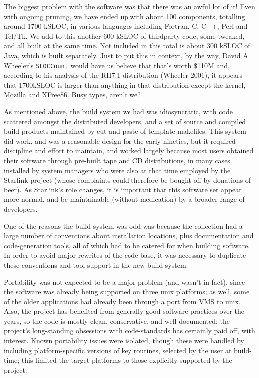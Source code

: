 \documentclass[11pt,twoside]{article}
\begin{document}
The biggest problem with the software was that there was an awful lot
of it!  Even with ongoing pruning, we have ended up with about 100
components, totalling around 1700 kSLOC, in various languages
including Fortran, C, C++, Perl and Tcl/Tk.  We add to this another
600 kSLOC of thirdparty code, some tweaked, and all built at the same
time.  Not included in this total is about 300 kSLOC of Java, which is
built separately.  Just to put this in context, by the way, David A
Wheeler's \texttt{SLOCCount} would have us believe that that's worth
\$110M and, according to his analysis of the RH7.1 distribution
(Wheeler 2001), it appears that 1700kSLOC is larger than anything in
that distribution except the kernel, Mozilla and XFree86.  Busy types,
aren't we?

As mentioned above, the build system we had was idiosyncratic, with
code scattered amongst the distributed developers, and a set of source
and compiled build products maintained by cut-and-paste of template
makefiles.  This system did work, and was a reasonable design for the
early nineties, but it required discipline and effort to maintain, and
worked largely because most users obtained their software through
pre-built tape and CD distributions, in many cases installed by system
managers who were also at that time employed by the Starlink project
(whose complaints could therefore be bought off by donations of beer).
As Starlink's role changes, it is important that this software set
appear more normal, and be maintainable (without medication) by a
broader range of developers.

One of the reasons the build system was odd was because the collection
had a large number of conventions about installation locations, plus
documentation and code-generation tools, all of which had to be
catered for when building software.  In order to avoid major rewrites
of the code base, it was necessary to duplicate these conventions and
tool support in the new build system.

Portability was not expected to be a major problem (and wasn't in
fact), since the software was already being supported on three unix
platforms; as well, some of the older applications had already been
through a port from VMS to unix.  Also, the project has benefited from
generally good software practices over the years, so the code is
mostly clean, conservative, and well documented; the project's
long-standing obsessions with code-standards has certainly paid off,
with interest.  Known portability issues were isolated, though these
were handled by including platform-specific versions of key routines,
selected by the user at build-time; this limited the target platforms
to those explicitly supported by the project.
\end{document}
